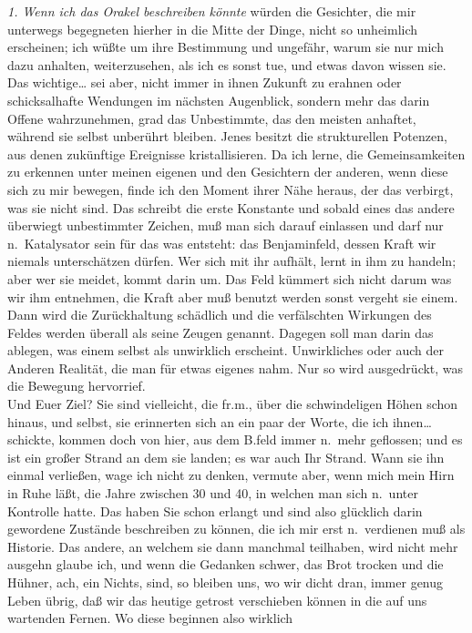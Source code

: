 \documentclass[
]{article}
\begin{document}
\emph{1. Wenn ich das Orakel beschreiben könnte} würden die Gesichter,
die mir unterwegs begegneten hierher in die Mitte der Dinge, nicht so
unheimlich erscheinen; ich wüßte um ihre Bestimmung und ungefähr, warum
sie nur mich dazu anhalten, weiterzusehen, als ich es sonst tue, und
etwas davon wissen sie. Das wichtige\ldots{} sei aber, nicht immer in
ihnen Zukunft zu erahnen oder schicksalhafte Wendungen im nächsten
Augenblick, sondern mehr das darin Offene wahrzunehmen, grad das
Unbestimmte, das den meisten anhaftet, während sie selbst unberührt
bleiben. Jenes besitzt die strukturellen Potenzen, aus denen zukünftige
Ereignisse kristallisieren. Da ich lerne, die Gemeinsamkeiten zu
erkennen unter meinen eigenen und den Gesichtern der anderen, wenn diese
sich zu mir bewegen, finde ich den Moment ihrer Nähe heraus, der das
verbirgt, was sie nicht sind. Das schreibt die erste Konstante und
sobald eines das andere überwiegt unbestimmter Zeichen, muß man sich
darauf einlassen und darf nur n.~Katalysator sein für das was entsteht:
das Benjaminfeld, dessen Kraft wir niemals unterschätzen dürfen. Wer
sich mit ihr aufhält, lernt in ihm zu handeln; aber wer sie meidet,
kommt darin um. Das Feld kümmert sich nicht darum was wir ihm entnehmen,
die Kraft aber muß benutzt werden sonst vergeht sie einem. Dann wird die
Zurückhaltung schädlich und die verfälschten Wirkungen des Feldes werden
überall als seine Zeugen genannt. Dagegen soll man darin das ablegen,
was einem selbst als unwirklich erscheint. Unwirkliches oder auch der
Anderen Realität, die man für etwas eigenes nahm. Nur so wird
ausgedrückt, was die Bewegung hervorrief.\\
Und Euer Ziel? Sie sind vielleicht, die fr.m., über die schwindeligen
Höhen schon hinaus, und selbst, sie erinnerten sich an ein paar der
Worte, die ich ihnen\ldots{} schickte, kommen doch von hier, aus dem
B.feld immer n.~mehr geflossen; und es ist ein großer Strand an dem sie
landen; es war auch Ihr Strand. Wann sie ihn einmal verließen, wage ich
nicht zu denken, vermute aber, wenn mich mein Hirn in Ruhe läßt, die
Jahre zwischen 30 und 40, in welchen man sich n.~unter Kontrolle hatte.
Das haben Sie schon erlangt und sind also glücklich darin gewordene
Zustände beschreiben zu können, die ich mir erst n.~verdienen muß als
Historie. Das andere, an welchem sie dann manchmal teilhaben, wird nicht
mehr ausgehn glaube ich, und wenn die Gedanken schwer, das Brot trocken
und die Hühner, ach, ein Nichts, sind, so bleiben uns, wo wir dicht
dran, immer genug Leben übrig, daß wir das heutige getrost verschieben
können in die auf uns wartenden Fernen. Wo diese beginnen also wirklich
\end{document}
